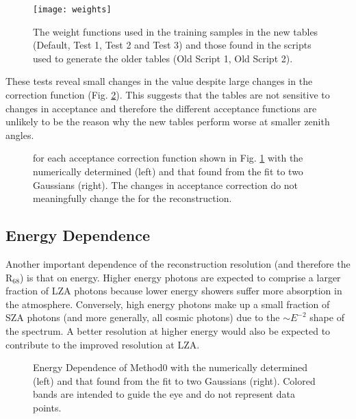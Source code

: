 \documentclass[main.tex]{subfiles}
\begin{document}
\begin{figure}[htbp]
  \centering
  \texttt{[image: weights]}
  \caption[Weight functions for offset from camera center.]{The weight functions used in the training samples in the new tables (Default, Test 1, Test 2 and Test 3) and those found in the scripts used to generate the older tables (Old Script 1, Old Script 2).}
  \label{fig:weights}
\end{figure}

These tests reveal small changes in the \rse value despite large changes in the correction function (Fig. \ref{fig:weight_tests}). This suggests that the \disp tables are not sensitive to changes in acceptance and therefore the different acceptance functions are unlikely to be the reason why the new \disp tables perform worse at smaller zenith angles.

\begin{figure}[htbp]
  \centering
  \caption[\rse for the acceptance correction functions.]{\rse for each acceptance correction function shown in Fig. \ref{fig:weights} with the numerically determined \rse (left) and that found from the fit to two Gaussians (right). The changes in acceptance correction do not meaningfully change the \rse for the reconstruction.}
  \label{fig:weight_tests}
\end{figure}

\subsection{Energy Dependence}
Another important dependence of the reconstruction resolution (and therefore the R$_{68}$) is that on energy. Higher energy photons are expected to comprise a larger fraction of LZA photons because lower energy showers suffer more absorption in the atmosphere. Conversely, high energy photons make up a small fraction of SZA photons (and more generally, all cosmic photons) due to the $\sim E^{-2}$ shape of the spectrum. A better resolution at higher energy would also be expected to contribute to the improved resolution at LZA.

\begin{figure}[htbp]
  \centering
  \caption[Energy Dependence of Method0.]{Energy Dependence of Method0 with the numerically determined \rse (left) and that found from the fit to two Gaussians (right). Colored bands are intended to guide the eye and do not represent data points.}
  \label{fig:energy_reg}
\end{figure}
\end{document}
